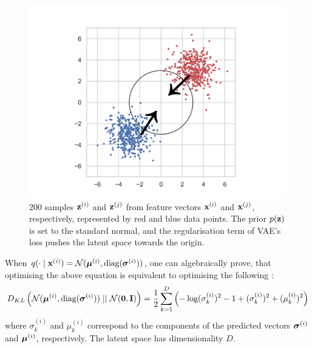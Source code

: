	\begin{figure}
		\centering
		\includegraphics[width=0.7\linewidth]{two_gaussian_distributions}
		\caption{200 samples $\mathbf{z}^{(i)}$ and $\mathbf{z}^{(j)}$ from feature vectors $\mathbf{x}^{(i)}$ and $\mathbf{x}^{(j)}$, respectively, represented by red and blue data points. The prior $p(\mathbf{z})$ is set to the standard normal, and the regularisation term of VAE's loss pushes the latent space towards the origin.}
		\label{fig:twogaussiandistributions}
	\end{figure}
	When $q (\cdot \mid \mathbf{x}^{(i)}) = \mathcal{N}(\bm{\mu}^{(i)}, \text{diag}(\bm{\sigma}^{(i)}))$, one can algebraically prove, that optimising the above equation is equivalent to optimising the following \citep{kingmaAutoEncodingVariationalBayes2022}: 
	\begin{equation}	
		D_{KL} \left( \mathcal{N}(\bm{\mu}^{(i)}, \text{diag}(\bm{\sigma}^{(i)})) \mid \mid \mathcal{N}(\bm{\mathbf{0}}, \mathbf{I}) \right) = \frac{1}{2} \sum_{k=1}^{D} \left( -\log (\sigma_k^{(i)})^2 - 1 + (\sigma_k^{(i)})^2 + (\mu_k^{(i)})^2 \right)
	\end{equation}
	where $\sigma_k^{(i)}$ and $\mu_k^{(i)}$ correspond to the components of the predicted vectors $\bm{\sigma}^{(i)}$ and $\bm{\mu}^{(i)}$, respectively. The latent space has dimensionality $D$.
	




